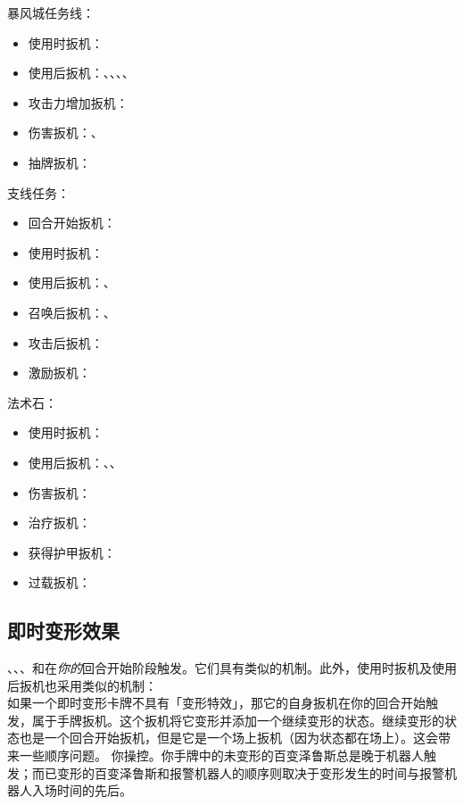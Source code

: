 暴风城任务线：
\begin{itemize}
    \item 使用时扳机：
    \item 使用后扳机：、、、、
    \item 攻击力增加扳机：
    \item 伤害扳机：、
    \item 抽牌扳机：
\end{itemize}

支线任务：
\begin{itemize}
    \item 回合开始扳机：
    \item 使用时扳机：
    \item 使用后扳机：、
    \item 召唤后扳机：、
    \item 攻击后扳机：
    \item 激励扳机：
\end{itemize}

法术石：
\begin{itemize}
    \item 使用时扳机：
    \item 使用后扳机：、、
    \item 伤害扳机：
    \item 治疗扳机：
    \item 获得护甲扳机：
    \item 过载扳机：
\end{itemize}

\subsection{即时变形效果}

、、、和在\emph{你的}回合开始阶段触发。它们具有类似的机制。此外，使用时扳机及使用后扳机也采用类似的机制：\\
如果一个即时变形卡牌不具有「变形特效」，那它的自身扳机在你的回合开始触发，属于手牌扳机。这个扳机将它变形并添加一个继续变形的状态。继续变形的状态也是一个回合开始扳机，但是它是一个场上扳机（因为状态都在场上）。这会带来一些顺序问题。
\example 你操控。你手牌中的未变形的百变泽鲁斯总是晚于机器人触发；而已变形的百变泽鲁斯和报警机器人的顺序则取决于变形发生的时间与报警机器人入场时间的先后。

